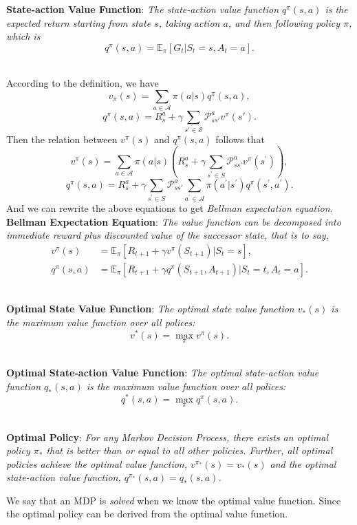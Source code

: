 \documentclass{progartcn}
\begin{document}
		\textbf{State-action Value Function}: \textit{The state-action value function $q^\pi(s,a)$ is the expected return starting from state $s$, taking action $a$, and then following policy $\pi$, which is}
		\[q^\pi(s,a)=\mathbb{E}_\pi[G_t|S_t=s, A_t=a].\]\

		According to the definition, we have
		\[v_\pi(s)=\sum_{a\in \mathcal{A}}\pi(a|s)q^\pi(s,a),\]
		\[q^\pi(s,a)=R_s^a+\gamma\sum_{s'\in \mathcal{S}}\mathcal{P}_{ss'}^av^\pi(s').\]
		Then the relation between $v^\pi(s)$ and $q^\pi(s,a)$ follows that
		\[v^{\pi}(s) =\sum_{a \in \mathcal{A}} \pi(a | s)\left( R_s^a+\gamma \sum_{s^{\prime} \in S} \mathcal{P}_{ss'}^a v^{\pi}\left(s^{\prime}\right)\right),\]
		\[q^{\pi}(s, a) =R_s^a+\gamma \sum_{s^{\prime} \in S} \mathcal{P}_{ss'}^a \sum_{a^{\prime} \in \mathcal{A}} \pi\left(a^{\prime} | s^{\prime}\right) q^{\pi}\left(s^{\prime}, a^{\prime}\right).\]
		And we can rewrite the above equations to get \textit{Bellman expectation equation}.\\

		\textbf{Bellman Expectation Equation}: \textit{The value function can be decomposed into immediate reward plus discounted value of the successor state, that is to say,}
		\[\begin{split}
		v^\pi(s)&=\mathbb{E}_\pi[R_{t+1}+\gamma v^\pi(S_{t+1})|S_t=s],\\
		q^\pi(s,a)&=\mathbb{E}_\pi[R_{t+1}+\gamma q^\pi(S_{t+1}, A_{t+1})|S_t=t,A_t=a].
		\end{split}
		\]\

		\textbf{Optimal State Value Function}: \textit{The optimal state value function $v_\ast(s)$ is the maximum value function over all polices:}
		\[v^\ast(s)=\max_\pi v^\pi(s).\]\

		\textbf{Optimal State-action Value Function}: \textit{The optimal state-action value function $q_\ast(s,a)$ is the maximum value function over all polices:}
		\[q^\ast(s,a)=\max_\pi q^\pi(s,a).\]\

		\textbf{Optimal Policy}: \textit{For any Markov Decision Process, there exists an optimal policy $\pi_\ast$ that is better than or equal to all other policies. Further, all optimal policies achieve the optimal value function, $v^{\pi_\ast}(s)=v_\ast(s)$ and the optimal state-action value function, $q^{\pi_\ast}(s,a)=q_\ast(s,a)$.}

		We say that an MDP is \textit{solved} when we know the optimal value function. Since the optimal policy can be derived from the optimal value function.\\
\end{document}
